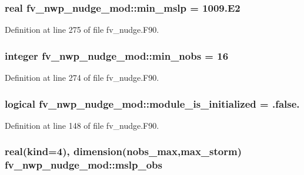 \subsubsection[{min\-\_\-mslp}]{\setlength{\rightskip}{0pt plus 5cm}real fv\-\_\-nwp\-\_\-nudge\-\_\-mod\-::min\-\_\-mslp = 1009.E2\hspace{0.3cm}{\ttfamily [private]}}\label{classfv__nwp__nudge__mod_a7bc4a9ade4f83f3866673db98fc33230}


Definition at line 275 of file fv\-\_\-nudge.\-F90.

\subsubsection[{min\-\_\-nobs}]{\setlength{\rightskip}{0pt plus 5cm}integer fv\-\_\-nwp\-\_\-nudge\-\_\-mod\-::min\-\_\-nobs = 16\hspace{0.3cm}{\ttfamily [private]}}\label{classfv__nwp__nudge__mod_a1097a1064cec1b746d3c06aebb722114}


Definition at line 274 of file fv\-\_\-nudge.\-F90.

\subsubsection[{module\-\_\-is\-\_\-initialized}]{\setlength{\rightskip}{0pt plus 5cm}logical fv\-\_\-nwp\-\_\-nudge\-\_\-mod\-::module\-\_\-is\-\_\-initialized = .false.\hspace{0.3cm}{\ttfamily [private]}}\label{classfv__nwp__nudge__mod_afe93a474895ccd632d9dfb88785e62f5}


Definition at line 148 of file fv\-\_\-nudge.\-F90.

\subsubsection[{mslp\-\_\-obs}]{\setlength{\rightskip}{0pt plus 5cm}real(kind=4), dimension({\bf nobs\-\_\-max},{\bf max\-\_\-storm}) fv\-\_\-nwp\-\_\-nudge\-\_\-mod\-::mslp\-\_\-obs\hspace{0.3cm}{\ttfamily [private]}}\label{classfv__nwp__nudge__mod_a9eee9ed61c6ec21fa45d4f80a88699fc}


